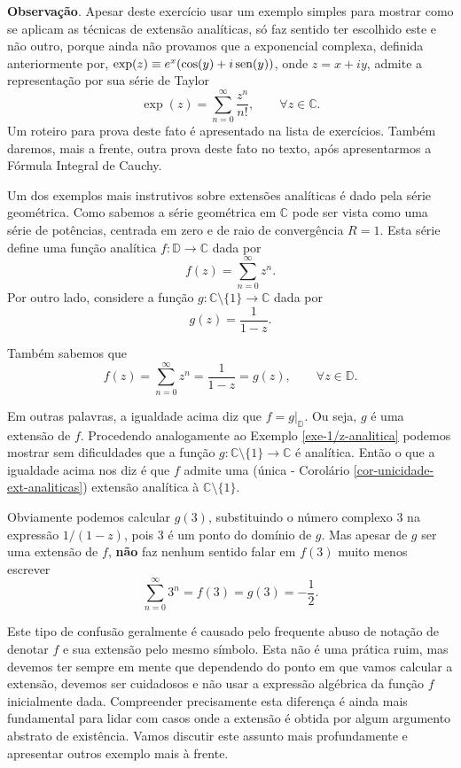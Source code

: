 \begin{exemplo}
\medskip 
\noindent
\textbf{Observação}. Apesar deste exercício usar um exemplo simples para
mostrar como se aplicam as técnicas de extensão analíticas, 
só faz sentido ter escolhido este e não outro, 
porque ainda não provamos que a exponencial complexa, definida 
anteriormente por, $\exp(z)\equiv e^{x}(\cos(y)+i\operatorname{sen}(y))$, onde $z=x+iy$,
admite a representação por sua série de Taylor 
\[
\exp(z) = \sum_{n=0}^{\infty} \frac{z^n}{n!}, \qquad \forall z\in\mathbb{C}.
\]
Um roteiro para prova deste fato é apresentado na lista de exercícios. 
Também daremos, mais a frente, outra prova deste fato no texto, após apresentarmos 
a Fórmula Integral de Cauchy.
\end{exemplo}







\begin{exemplo}
Um dos exemplos mais instrutivos sobre extensões analíticas é dado pela 
série geométrica. Como sabemos a série geométrica em $\mathbb{C}$ pode ser 
vista como uma série de potências, centrada em zero e de raio de convergência $R=1$.
Esta série define uma função analítica $f:\mathbb{D}\to\mathbb{C}$ dada por 
\[
f(z) = \sum_{n=0}^{\infty} z^n.
\]
Por outro lado, considere a 
função $g:\mathbb{C}\setminus\{1\}\to\mathbb{C}$ dada por
\[
g(z) = \frac{1}{1-z}.
\]

Também sabemos que
\[
f(z) = \sum_{n=0}^{\infty}z^n  = \frac{1}{1-z} = g(z), \qquad \forall z\in\mathbb{D}.
\]

Em outras palavras, a igualdade acima diz que $f=g|_{\mathbb{D}}$. 
Ou seja, $g$ é uma extensão de $f$. Procedendo analogamente ao Exemplo \ref{exe-1/z-analitica} podemos
mostrar sem dificuldades que a função 
$g:\mathbb{C}\setminus\{1\}\to\mathbb{C}$ é analítica. 
Então o que a igualdade acima nos diz é que $f$ admite uma 
(única - Corolário \ref{cor-unicidade-ext-analiticas}) 
extensão analítica à $\mathbb{C}\setminus\{1\}$. 

Obviamente podemos calcular $g(3)$, substituindo o número complexo $3$ na 
expressão $1/(1-z)$, pois $3$ é um ponto do domínio de $g$. 
Mas apesar de $g$ ser uma extensão de $f$, \textbf{não} faz nenhum sentido
falar em $f(3)$ muito menos escrever 
\[
\sum_{n=0}^{\infty} 3^n = f(3) = g(3) = -\frac{1}{2}.
\]

Este tipo de confusão geralmente é causado pelo frequente abuso de notação
de denotar $f$ e sua extensão pelo mesmo símbolo. Esta não é uma prática
ruim, mas devemos ter sempre em mente que dependendo do ponto em que vamos
calcular a extensão, devemos ser cuidadosos e não 
usar a expressão algébrica da função $f$ inicialmente dada.
Compreender precisamente esta diferença é ainda mais fundamental
para lidar com casos onde a extensão é obtida por algum 
argumento abstrato de existência. Vamos discutir este assunto
mais profundamente e apresentar outros exemplo mais à frente.
\end{exemplo}


